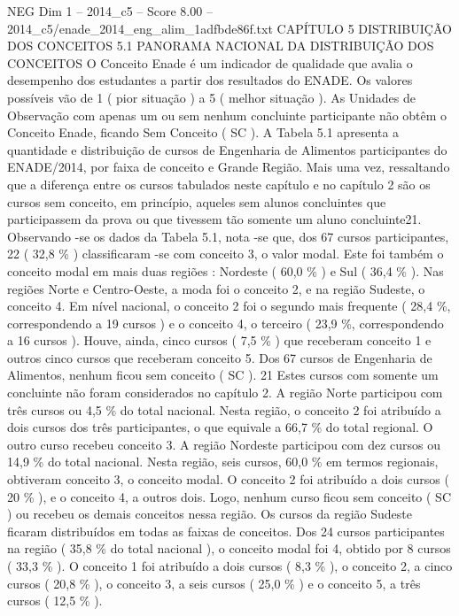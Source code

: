 \begin{textsample}{NEG Dim 1 – 2014\_c5 – Score 8.00 – 2014\_c5/enade\_2014\_eng\_alim\_1adfbde86f.txt}  \label{ex:f1_neg_339}
CAPÍTULO 5 DISTRIBUIÇÃO DOS CONCEITOS 5.1 PANORAMA NACIONAL DA DISTRIBUIÇÃO DOS CONCEITOS O Conceito Enade é um indicador de qualidade que avalia o desempenho dos estudantes a partir dos resultados do ENADE.
Os valores possíveis vão de 1 ( pior situação ) a 5 ( melhor situação ).
As Unidades de Observação com apenas um ou sem nenhum concluinte participante não obtêm o Conceito Enade, ficando Sem Conceito ( SC ).
A Tabela 5.1 apresenta a quantidade e distribuição de cursos de Engenharia de Alimentos participantes do ENADE/2014, por faixa de conceito e Grande Região.
Mais uma vez, ressaltando que a diferença entre os cursos tabulados neste capítulo e no capítulo 2 são os cursos sem conceito, em princípio, aqueles sem alunos concluintes que participassem da prova ou que tivessem tão somente um aluno concluinte21.
Observando -se os dados da Tabela 5.1, nota -se que, dos 67 cursos participantes, 22 ( 32,8 \% ) classificaram -se com conceito 3, o valor modal.
Este foi também o conceito modal em mais duas regiões : Nordeste ( 60,0 \% ) e Sul ( 36,4 \% ).
Nas regiões Norte e Centro-Oeste, a moda foi o conceito 2, e na região Sudeste, o conceito 4.
Em nível nacional, o conceito 2 foi o segundo mais frequente ( 28,4 \%, correspondendo a 19 cursos ) e o conceito 4, o terceiro ( 23,9 \%, correspondendo a 16 cursos ).
Houve, ainda, cinco cursos ( 7,5 \% ) que receberam conceito 1 e outros cinco cursos que receberam conceito 5.
Dos 67 cursos de Engenharia de Alimentos, nenhum ficou sem conceito ( SC ). 21 Estes cursos com somente um concluinte não foram considerados no capítulo 2.
A região Norte participou com três cursos ou 4,5 \% do total nacional.
Nesta região, o conceito 2 foi atribuído a dois cursos dos três participantes, o que equivale a 66,7 \% do total regional.
O outro curso recebeu conceito 3.
A região Nordeste participou com dez cursos ou 14,9 \% do total nacional.
Nesta região, seis cursos, 60,0 \% em termos regionais, obtiveram conceito 3, o conceito modal.
O conceito 2 foi atribuído a dois cursos ( 20 \% ), e o conceito 4, a outros dois.
Logo, nenhum curso ficou sem conceito ( SC ) ou recebeu os demais conceitos nessa região.
Os cursos da região Sudeste ficaram distribuídos em todas as faixas de conceitos.
Dos 24 cursos participantes na região ( 35,8 \% do total nacional ), o conceito modal foi 4, obtido por 8 cursos ( 33,3 \% ).
O conceito 1 foi atribuído a dois cursos ( 8,3 \% ), o conceito 2, a cinco cursos ( 20,8 \% ), o conceito 3, a seis cursos ( 25,0 \% ) e o conceito 5, a três cursos ( 12,5 \% ).

\end{textsample}
